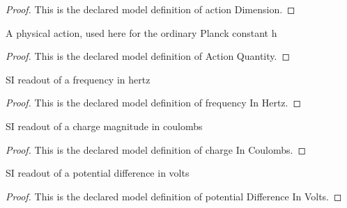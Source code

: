 \begin{proof}
  This is the declared model definition of action Dimension.
\end{proof}
\begin{definition}
  \label{def:physics:phyx-mini-0515:phyxminiproblems-problemphyxmini0515-actionquantity}
  A physical action, used here for the ordinary Planck constant h
\end{definition}
\begin{proof}
  This is the declared model definition of Action Quantity.
\end{proof}
\begin{definition}
  \label{def:physics:phyx-mini-0515:phyxminiproblems-problemphyxmini0515-frequencyinhertz}
  SI readout of a frequency in hertz
\end{definition}
\begin{proof}
  This is the declared model definition of frequency In Hertz.
\end{proof}
\begin{definition}
  \label{def:physics:phyx-mini-0515:phyxminiproblems-problemphyxmini0515-chargeincoulombs}
  SI readout of a charge magnitude in coulombs
\end{definition}
\begin{proof}
  This is the declared model definition of charge In Coulombs.
\end{proof}
\begin{definition}
  \label{def:physics:phyx-mini-0515:phyxminiproblems-problemphyxmini0515-potentialdifferenceinvolts}
  SI readout of a potential difference in volts
\end{definition}
\begin{proof}
  This is the declared model definition of potential Difference In Volts.
\end{proof}
